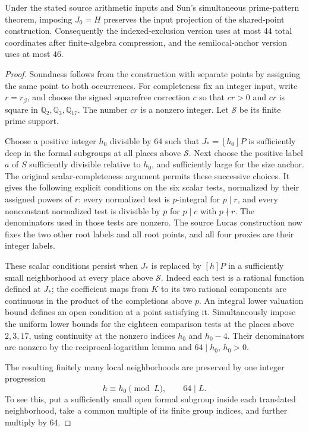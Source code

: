 \begin{proposition}
Under the stated source arithmetic inputs and Sun's simultaneous
prime-pattern theorem, imposing $J_0=H$ preserves the input projection
of the shared-point construction.  Consequently the indexed-exclusion
version uses at most $44$ total coordinates after finite-algebra
compression, and the semilocal-anchor version uses at most $46$.
\end{proposition}
\begin{proof}
Soundness follows from the construction with separate points by assigning
the same point to both occurrences.  For completeness fix an integer input,
write $r=r_\beta$, and choose the signed squarefree correction $c$ so that
$cr>0$ and $cr$ is square in $\mathbb Q_2,\mathbb Q_3,\mathbb Q_{17}$.
The number $cr$ is a nonzero integer.  Let $\mathcal S$ be its finite prime
support.

Choose a positive integer $h_0$ divisible by $64$ such that
$J_*= [h_0]P$ is sufficiently deep in the formal subgroups at all places
above $\mathcal S$.  Next choose the positive label $a$ of $S$ sufficiently
divisible relative to $h_0$, and sufficiently large for the size anchor.
The original scalar-completeness argument permits these successive choices.
It gives the following explicit conditions on the six scalar tests,
normalized by their assigned powers of $r$: every normalized test is
$p$-integral for $p\mid r$, and every nonconstant normalized test is divisible
by $p$ for $p\mid c$ with $p\nmid r$.  The denominators used in those tests
are nonzero.  The source Lucas construction now fixes the two other root
labels and all root points, and all four proxies are their integer labels.

These scalar conditions persist when $J_*$ is replaced by $[h]P$ in a
sufficiently small neighborhood at every place above $\mathcal S$.
Indeed each test is a rational function defined at $J_*$; the coefficient
maps from $K$ to its two rational components are continuous in the product
of the completions above $p$.  An integral lower valuation bound defines
an open condition at a point satisfying it.  Simultaneously impose the
uniform lower bounds for the eighteen comparison tests at the places
above $2,3,17$, using continuity at the nonzero indices $h_0$ and $h_0-4$.
Their denominators are nonzero by the reciprocal-logarithm lemma and
$64\mid h_0$, $h_0>0$.

The resulting finitely many local neighborhoods are preserved by one
integer progression
\[
                       h\equiv h_0\pmod L,
                       \qquad 64\mid L.
\]
To see this, put a sufficiently small open formal subgroup inside each
translated neighborhood, take a common multiple of its finite group
indices, and further multiply by $64$.


\end{proof}

